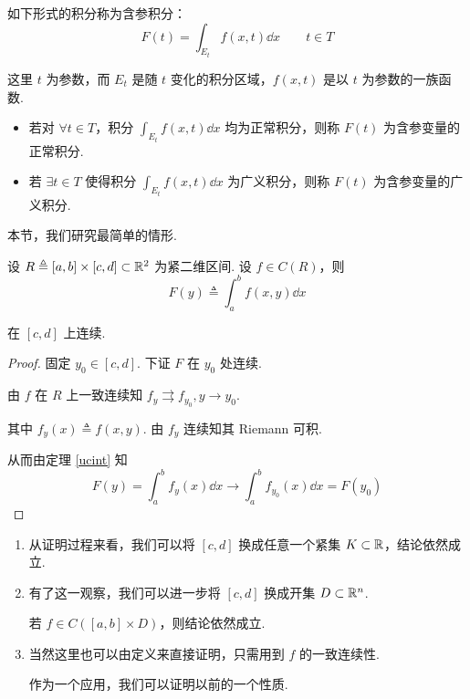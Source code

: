 
如下形式的积分称为含参积分：
$$
F(t)=\int_{E_t}f(x,t)\dd x\qquad t\in T
$$

这里 $t$ 为参数，而 $E_t$ 是随 $t$ 变化的积分区域，$f(x,t)$ 是以 $t$ 为参数的一族函数.

\begin{itemize}
    \item 若对 $\forall t\in T$，积分 $\displaystyle\int_{E_t}f(x,t)\dd x$ 均为正常积分，则称 $F(t)$ 为含参变量的正常积分.
    
    \item 若 $\exists t\in T$ 使得积分 $\displaystyle\int_{E_t}f(x,t)\dd x$ 为广义积分，则称 $F(t)$ 为含参变量的广义积分.
\end{itemize}

本节，我们研究最简单的情形.


\begin{property}
    设 $R\triangleq[a,b]\times[c,d]\subset\mathbb{R}^2$ 为紧二维区间. 设 $f\in C(R)$，则
$$
F(y)\triangleq\int_a^bf(x,y)\dd x
$$

    在 $[c,d]$ 上连续.
\end{property}
\begin{proof}
    固定 $y_0\in[c,d]$. 下证 $F$ 在 $y_0$ 处连续.

    由 $f$ 在 $R$ 上一致连续知 $f_y\rightrightarrows f_{y_0},y\to y_0$.

    其中 $f_y(x)\triangleq f(x,y)$. 由 $f_y$ 连续知其 Riemann 可积.

    从而由定理 \ref{ucint} 知
$$
F(y)=\int_a^bf_y(x)\dd x\to\int_a^bf_{y_0}(x)\dd x=F(y_0)
$$
\end{proof}

\begin{hint}
    \begin{enumerate}
        \item 从证明过程来看，我们可以将 $[c,d]$ 换成任意一个紧集 $K\subset\mathbb{R}$，结论依然成立.
        
        \item 有了这一观察，我们可以进一步将 $[c,d]$ 换成开集 $D\subset\mathbb{R}^n$.
        
        若 $f\in C([a,b]\times D)$，则结论依然成立.

        \item 当然这里也可以由定义来直接证明，只需用到 $f$ 的一致连续性.
        
        作为一个应用，我们可以证明以前的一个性质.
    \end{enumerate}
\end{hint}

